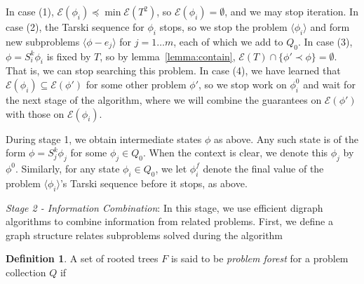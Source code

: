 \documentclass[11pt,reqno]{amsart}
\theoremstyle{definition}
\newtheorem{defn}[thm]{Definition}
\numberwithin{equation}{section}
\newcommand{\lag}{\langle}
\newcommand{\rag}{\rangle}
\newcommand{\pre}{\phi}
\newcommand{\sub}{\subseteq}
\newcommand{\fix}{\mathcal{E}}
\newcommand{\peq}{\preceq}
\newcommand{\pe}{\prec}
\newcommand{\acto}{Q_0}
\newcommand{\act}{Q}
\newcommand{\preo}{\pre^{0}}
\newcommand{\pref}{\pre^{f}}
\newcommand{\forest}{F}
\begin{document}
In case (1), $\fix(\pre_i) \peq \min \fix(T^2)$, so $\fix(\pre_i) = \emptyset$, and we may stop iteration. 
In case (2), the Tarski sequence for $\pre_i$ stops, so we stop the problem $\lag \pre_i \rag$ and form new subproblems $\lag \pre - e_j \rag$ for $j = 1 \hdots m$, each of which we add to $\acto$.  
In case (3), $\pre = S_i^k \pre_i$ is fixed by $T$, so by lemma~\ref{lemma:contain}, $\fix(T) \cap \{\pre' \pe \pre \} = \emptyset$.
That is, we can stop searching this problem.
In case (4), we have learned that $\fix(\pre_i) \sub \fix(\pre')$ for some other problem $\pre'$, so we stop work on $\preo_i$ and wait for the next stage of the algorithm, where we will combine the guarantees on $\fix(\pre')$ with those on $\fix(\pre_i)$.

During stage 1, we obtain intermediate states $\pre$ as above.
Any such state is of the form $\pre = S_j^k \pre_j$ for some $\pre_j \in \acto$.
When the context is clear, we denote this $\pre_j$ by $\preo$. 
Similarly, for any state $\pre_i \in \acto$, we let $\pref_i$ denote the final value of the problem $\lag \pre_i \rag$'s Tarski sequence before it stops, as above. 

\emph{Stage 2 - Information Combination}: In this stage, we use efficient digraph algorithms to combine information from related problems.
First, we define a graph structure relates subproblems solved during the algorithm
\begin{defn}
A set of rooted trees $\forest$ is said to be \emph{problem forest} for a problem collection $\act$ if
\end{defn}
\end{document}
